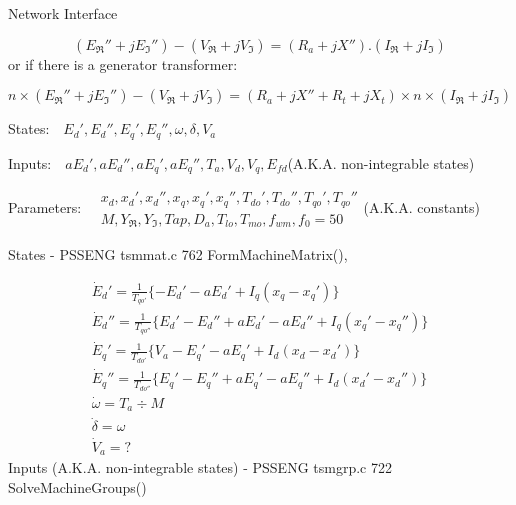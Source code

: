 \documentclass[letterpaper]{article}
\begin{document}
Network Interface


\bigskip


\bigskip

\begin{equation*}
(E_{\Re }''+jE_{\Im }'')-(V_{\Re }+jV_{\Im })=(R_{a}+jX'').(I_{\Re
}+jI_{\Im })
\end{equation*}
or if there is a generator transformer:

\begin{equation*}
n\times (E_{\Re }''+jE_{\Im }'')-(V_{\Re }+jV_{\Im
})=(R_{a}+jX''+R_{t}+jX_{t})\times n\times (I_{\Re }+jI_{\Im })
\end{equation*}

\bigskip

\clearpage
States:\ \  $E_{d}',E_{d}'',E_{q}',E_{q}'',\omega ,\delta ,V_{a}$

Inputs:\ \ 
$aE_{d}',aE_{d}'',aE_{q}',aE_{q}'',T_{a},V_{d},V_{q},E_{\mathit{fd}}$(A.K.A.
non-integrable states)

Parameters:\ \ 
$\begin{gathered}x_{d},x_{d}',x_{d}'',x_{q},x_{q}',x_{q}'',T_{\mathit{do}}',T_{\mathit{do}}'',T_{\mathit{qo}}',T_{\mathit{qo}}''\\M,Y_{\Re
},Y_{\Im
},\mathit{Tap},D_{a},T_{\mathit{lo}},T_{\mathit{mo}},f_{\mathit{wm}},f_{0}=50\end{gathered}$(A.K.A.
constants)

States - PSSENG tsmmat.c 762 FormMachineMatrix(), 

\begin{equation*}
\begin{gathered}\dot{E}_{d}'=\frac{1}{T_{\mathit{qo}'}}\{-E_{d}'-aE_{d}'+I_{q}(x_{q}-x_{q}')\}\\\dot{E}_{d}''=\frac{1}{T_{\mathit{qo}''}}\{E_{d}'-E_{d}''+aE_{d}'-aE_{d}''+I_{q}(x_{q}'-x_{q}'')\}\\\dot{E}_{q}'=\frac{1}{T_{\mathit{do}'}}\{V_{a}-E_{q}'-aE_{q}'+I_{d}(x_{d}-x_{d}')\}\\\dot{E}_{q}''=\frac{1}{T_{\mathit{do}''}}\{E_{q}'-E_{q}''+aE_{q}'-aE_{q}''+I_{d}(x_{d}'-x_{d}'')\}\\\dot{\omega
}=T_{a}\div M\\\dot{\delta }=\omega \\\dot{V}_{a}=?\end{gathered}
\end{equation*}
Inputs (A.K.A. non-integrable states) - PSSENG tsmgrp.c 722
SolveMachineGroups()
\end{document}
